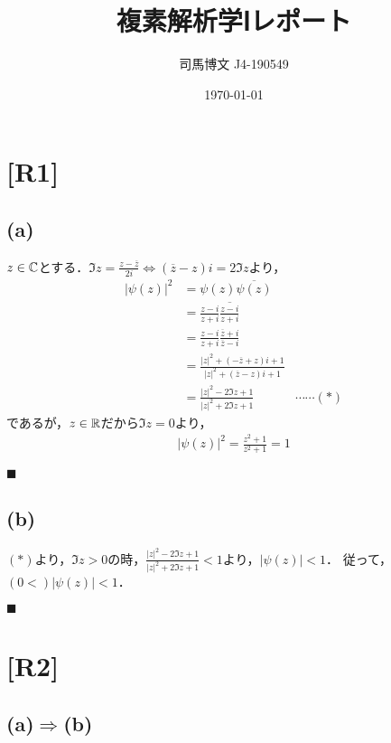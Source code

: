 \documentclass[uplatex, 12pt, dvipdfmx]{jsarticle}
\title{複素解析学Ⅰレポート}
\author{司馬博文 J4-190549}
\date{\today}
\begin{document}
\maketitle
\section*{[R1]}
\subsection*{(a)}
$z\in\mathbb{C}$とする．$\Im z=\frac{z-\overline{z}}{2i}\Leftrightarrow (\overline{z}-z)i=2\Im z$より，
\begin{align*}
    |\psi(z)|^2 &= \psi(z)\overline{\psi(z)}\\
    &= \frac{z-i}{z+i}\overline{\frac{z-i}{z+i}}\\
    &= \frac{z-i}{z+i}\frac{\overline{z}+i}{\overline{z}-i}\\
    &= \frac{|z|^2+(-\overline{z}+z)i+1}{|z|^2+(\overline{z}-z)i+1}\\
    &= \frac{|z|^2-2\Im z+1}{|z|^2+2\Im z+1} &\cdots\cdots(*)
\end{align*}
であるが，$z\in\mathbb{R}$だから$\Im z=0$より，
\begin{align*}
    |\psi(z)|^2= \frac{z^2+1}{z^2+1}=1
\end{align*}
\begin{flushright}
    $\blacksquare$
\end{flushright}

\subsection*{(b)}

$(*)$より，$\Im z>0$の時，$\frac{|z|^2-2\Im z+1}{|z|^2+2\Im z+1}<1$より，$|\psi(z)|<1$．
従って，$(0<)|\psi(z)|<1$．
\begin{flushright}$\blacksquare$\end{flushright}

\section*{[R2]}
\subsection*{(a)$\Rightarrow$(b)}
\end{document}
